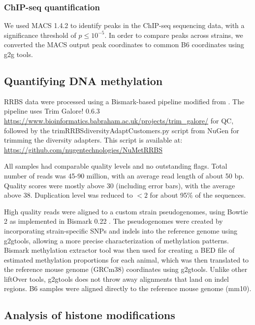 \documentclass[
  11pt,
]{article}
\begin{document}
\hypertarget{chip-seq-quantification}{%
\subsubsection{ChIP-seq quantification}\label{chip-seq-quantification}}

We used MACS 1.4.2 \citep{pmid18798982} to identify peaks in the
ChIP-seq sequencing data, with a significance threshold of
\(p \leq 10^{-5}\). In order to compare peaks across strains, we
converted the MACS output peak coordinates to common B6 coordinates
using g2g tools.

\hypertarget{quantifying-dna-methylation}{%
\subsection{Quantifying DNA
methylation}\label{quantifying-dna-methylation}}

RRBS data were processed using a Bismark-based pipeline modified from
\citet{pmid30348905}. The pipeline uses Trim Galore! 0.6.3
\url{https://www.bioinformatics.babraham.ac.uk/projects/trim_galore/}
for QC, followed by the trimRRBSdiversityAdaptCustomers.py script from
NuGen for trimming the diversity adapters. This script is available at:
\url{https://github.com/nugentechnologies/NuMetRRBS}

All samples had comparable quality levels and no outstanding flags.
Total number of reads was 45-90 million, with an average read length of
about 50 bp. Quality scores were mostly above 30 (including error bars),
with the average above 38. Duplication level was reduced to \(<2\) for
about 95\% of the sequences.

High quality reads were aligned to a custom strain pseudogenomes, using
Bowtie 2 \citep{langmead2012fast} as implemented in Bismark 0.22
\citep{pmid21493656}. The pseudogenomes were created by incorporating
strain-specific SNPs and indels into the reference genome using
g2gtools, allowing a more precise characterization of methylation
patterns. Bismark methylation extractor tool was then used for creating
a BED file of estimated methylation proportions for each animal, which
was then translated to the reference mouse genome (GRCm38) coordinates
using g2gtools. Unlike other liftOver tools, g2gtools does not throw
away alignments that land on indel regions. B6 samples were aligned
directly to the reference mouse genome (mm10).

\hypertarget{analysis-of-histone-modifications}{%
\subsection{Analysis of histone
modifications}\label{analysis-of-histone-modifications}}
\end{document}

